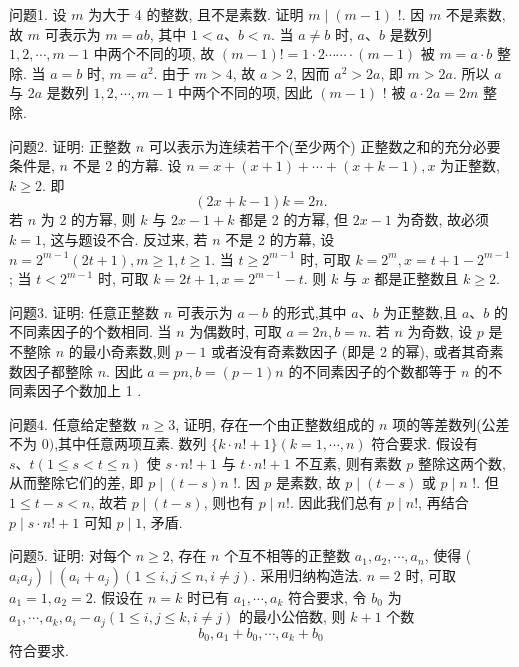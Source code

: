 
问题1. 设 $m$ 为大于 4 的整数, 且不是素数.
证明 $m \mid(m-1)$ !.
因 $m$ 不是素数,故 $m$ 可表示为 $m=a b$, 其中 $1<a 、 b<n$. 当 $a \neq b$ 时, $a 、 b$ 是数列 $1,2, \cdots, m-1$ 中两个不同的项, 故 $(m-1) !=1 \cdot 2 \cdots \cdots \cdot (m-1)$ 被 $m=a \cdot b$ 整除.
当 $a=b$ 时, $m=a^2$. 由于 $m>4$, 故 $a>2$, 因而 $a^2>2 a$, 即 $m>2 a$. 所以 $a$ 与 $2 a$ 是数列 $1,2, \cdots, m-1$ 中两个不同的项, 因此 $(m-1)$ ! 被 $a \cdot 2 a= 2 m$ 整除.



问题2. 证明: 正整数 $n$ 可以表示为连续若干个(至少两个) 正整数之和的充分必要条件是, $n$ 不是 2 的方幕.
设 $n=x+(x+1)+\cdots+(x+k-1), x$ 为正整数, $k \geqslant 2$. 即
$$
(2 x+k-1) k=2 n .
$$
若 $n$ 为 2 的方幂, 则 $k$ 与 $2 x-1+k$ 都是 2 的方幂, 但 $2 x-1$ 为奇数, 故必须 $k=1$, 这与题设不合.
反过来, 若 $n$ 不是 2 的方幕, 设 $n=2^{m-1}(2 t+1), m \geqslant 1, t \geqslant 1$. 当 $t \geqslant 2^{m-1}$ 时, 可取 $k=2^m, x=t+1-2^{m-1}$; 当 $t<2^{m-1}$ 时, 可取 $k=2 t+1, x= 2^{m-1}-t$. 则 $k$ 与 $x$ 都是正整数且 $k \geqslant 2$.



问题3. 证明: 任意正整数 $n$ 可表示为 $a-b$ 的形式,其中 $a 、 b$ 为正整数,且 $a 、 b$ 的不同素因子的个数相同.
当 $n$ 为偶数时, 可取 $a=2 n, b=n$. 若 $n$ 为奇数, 设 $p$ 是不整除 $n$ 的最小奇素数,则 $p-1$ 或者没有奇素数因子 (即是 2 的幂), 或者其奇素数因子都整除 $n$. 因此 $a=p n, b=(p-1) n$ 的不同素因子的个数都等于 $n$ 的不同素因子个数加上 1 .



问题4. 任意给定整数 $n \geqslant 3$, 证明, 存在一个由正整数组成的 $n$ 项的等差数列(公差不为 0$)$,其中任意两项互素.
数列 $\{k \cdot n !+1\}(k=1, \cdots, n)$ 符合要求.
假设有 $s 、 t(1 \leqslant s<t \leqslant n)$ 使 $s \cdot n !+1$ 与 $t \cdot n !+1$ 不互素, 则有素数 $p$ 整除这两个数, 从而整除它们的差, 即 $p \mid(t-s) n$ !. 因 $p$ 是素数, 故 $p \mid(t-s)$ 或 $p \mid n$ !. 但 $1 \leqslant t-s<n$, 故若 $p \mid(t-s)$, 则也有 $p \mid n !$. 因此我们总有 $p \mid n !$, 再结合 $p \mid s \cdot n !+1$ 可知 $p \mid 1$, 矛盾.



问题5. 证明: 对每个 $n \geqslant 2$, 存在 $n$ 个互不相等的正整数 $a_1, a_2, \cdots, a_n$, 使得 ( $a_i \left.a_j\right) \mid\left(a_i+a_j\right)(1 \leqslant i, j \leqslant n, i \neq j)$.
采用归纳构造法.
$n=2$ 时, 可取 $a_1=1, a_2=2$. 假设在 $n=k$ 时已有 $a_1, \cdots, a_k$ 符合要求, 令 $b_0$ 为 $a_1, \cdots, a_k, a_i-a_j(1 \leqslant i, j \leqslant k, i \neq j)$ 的最小公倍数, 则 $k+1$ 个数
$$
b_0, a_1+b_0, \cdots, a_k+b_0
$$
符合要求.


